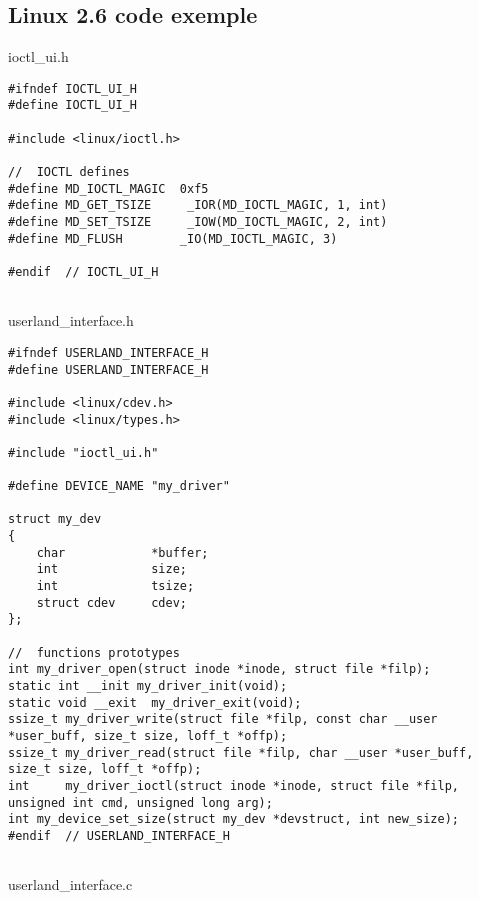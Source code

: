 \documentclass[11pt]{report}
\begin{document}
    \subsection{Linux 2.6 code exemple}
    ioctl\_ui.h
    \begin{lstlisting}
#ifndef IOCTL_UI_H
#define IOCTL_UI_H

#include <linux/ioctl.h>

//  IOCTL defines
#define MD_IOCTL_MAGIC  0xf5
#define MD_GET_TSIZE     _IOR(MD_IOCTL_MAGIC, 1, int)
#define MD_SET_TSIZE     _IOW(MD_IOCTL_MAGIC, 2, int)
#define MD_FLUSH        _IO(MD_IOCTL_MAGIC, 3)

#endif  // IOCTL_UI_H
    
    \end{lstlisting}
    userland\_interface.h
    \begin{lstlisting}
#ifndef USERLAND_INTERFACE_H
#define USERLAND_INTERFACE_H

#include <linux/cdev.h>
#include <linux/types.h>

#include "ioctl_ui.h"

#define DEVICE_NAME "my_driver"

struct my_dev
{
    char            *buffer;
    int             size;
    int             tsize;
    struct cdev     cdev;
};

//  functions prototypes
int my_driver_open(struct inode *inode, struct file *filp);
static int __init my_driver_init(void);
static void __exit  my_driver_exit(void);
ssize_t my_driver_write(struct file *filp, const char __user *user_buff, size_t size, loff_t *offp);
ssize_t my_driver_read(struct file *filp, char __user *user_buff, size_t size, loff_t *offp);
int     my_driver_ioctl(struct inode *inode, struct file *filp, unsigned int cmd, unsigned long arg);
int my_device_set_size(struct my_dev *devstruct, int new_size);
#endif  // USERLAND_INTERFACE_H
    
    \end{lstlisting}
    userland\_interface.c
\end{document}
